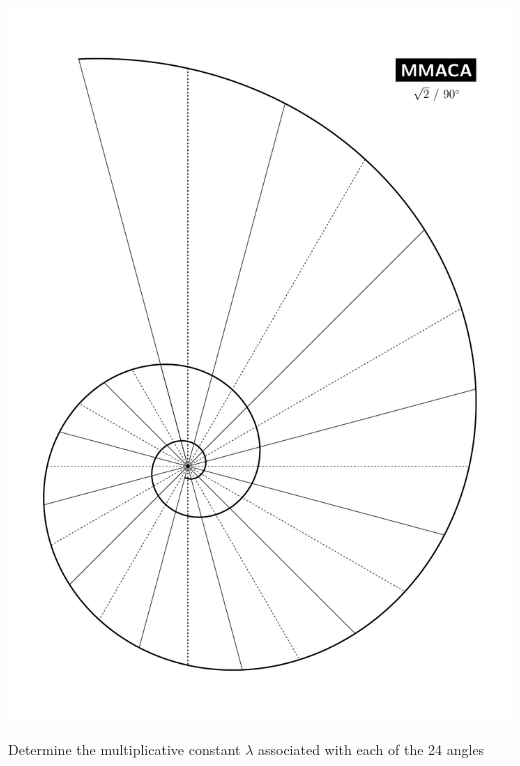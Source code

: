 \documentclass[a4paper,12pt]{article}
\begin{document}
\begin{center}
        \includegraphics[scale=0.3535]{./pictures/Spiral_Root2_090}

        \bigskip \bigskip

        Determine the multiplicative constant $\lambda$ associated with each of the 24 angles



    \end{center}

    \newpage

\end{document}
